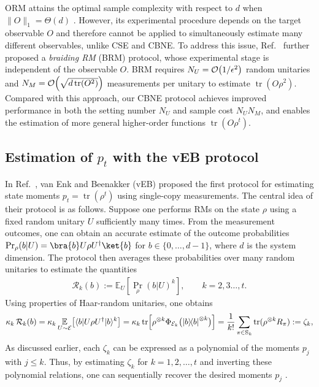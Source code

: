 \documentclass[aps,prl,twocolumn,nofootinbib,superscriptaddress,10pt]{revtex4-2}
\let\originalleft\left
\let\originalright\right
\renewcommand{\left}{\mathopen{}\mathclose\bgroup\originalleft}
\renewcommand{\right}{\aftergroup\egroup\originalright}
\def\E{ {\mathbb E} } %
\def\>{\rangle}
\def\<{\langle}
\newcommand{\ketbra}[2]{\ensuremath{\left|#1\right\rangle\!\left\langle#2\right|}}
\DeclareMathOperator{\Tr}{tr}
\newcommand{\bigo}[1]{\mathcal{O}\left(#1\right)}
\theoremstyle{plain}
\theoremstyle{definition}
\begin{document}
ORM attains the optimal sample complexity with respect to $d$ when $\|O\|_1=\Theta(d)$ \cite{du2025optimal}. 
However, its experimental procedure depends on the target observable $O$ and therefore cannot be applied to simultaneously estimate many different observables, unlike CSE and CBNE. 
To address this issue, Ref.~\cite{du2025optimal} further proposed a \emph{braiding RM} (BRM) protocol, whose experimental stage is independent of the observable $O$. 
BRM requires $N_U=\bigo{1/\epsilon^2}$ random unitaries and $N_M=\bigo{\sqrt{d\Tr(O^2)}}$ measurements per unitary to estimate $\Tr(O\rho^2)$. 
Compared with this approach, our CBNE protocol achieves improved performance in both the setting number $N_U$ and sample cost $N_UN_M$, and  enables the estimation of more general higher-order functions $\Tr(O\rho^t)$.




\subsection{Estimation of \texorpdfstring{$p_t$}{} with the vEB protocol}

In Ref.~\cite{PhysRevLett.108.110503}, van Enk and Beenakker (vEB) proposed the first protocol for estimating state moments $p_t=\Tr(\rho^t)$ using single-copy measurements. 
The central idea of their protocol is as follows. 
Suppose one performs RMs on the state $\rho$ using a fixed random unitary $U$ sufficiently many times. 
From the measurement outcomes, one can obtain an accurate estimate of the outcome probabilities
$\Pr_\rho(b|U)=\bra{b}U\rho U^\dagger\ket{b}$ for $b\in\{0,\dots,d-1\}$, where $d$ is the system dimension. 
The protocol then averages these probabilities over many random unitaries to estimate the quantities
\begin{align}
\mathcal R_k(b):=\mathbb E_U[{\Pr}_\rho(b|U)^k], \qquad k=2,3\dots,t .
\end{align}
Using properties of Haar-random unitaries, one obtains
\begin{align}\label{eq:zeta_def_prlSM}
\kappa_k \, \mathcal R_k(b)
=
\kappa_k \, \underset{U\sim \mathcal E}{\E} \left[\<b|U\rho U^{\dag}|b\>^k\right]
= \kappa_k \Tr \left[ \rho^{\otimes k}  \Phi_{\mathcal E_{k}} \big( \ketbra{b}{b}^{\otimes k} \big) \right]
= \frac{1}{k!}\sum_{\pi\in \mathrm{S}_k}\Tr(\rho^{\otimes k}R_\pi) :=\zeta_k,
\end{align}
As discussed earlier, each $\zeta_k$ can be expressed as a polynomial of the moments $p_j$ with $j\le k$.
Thus, by estimating $\zeta_k$ for $k=1,2,\dots,t$ and inverting these polynomial relations, one can sequentially recover the desired moments $p_j$ \cite{PhysRevLett.108.110503}.
\end{document}
